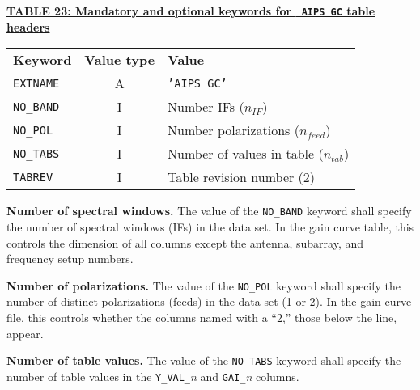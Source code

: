 \documentclass[twoside]{article}
\newcommand{\npol}{$n_{feed}$}
\newcommand{\nif}{$n_{IF}$}
\newcommand{\ntab}{$n_{tab}$}
\begin{document}
\begin{center}
\underline{\bf{TABLE 23: Mandatory and optional keywords for {\tt
   AIPS GC} table headers}}\\
\begin{tabular}{lcl}
\noalign{\vspace{2pt}} \label{ta:GCkeys}
\underline{{\bf Keyword}} & \underline{\bf{Value type}} &
    \underline{\bf{Value\vphantom{y}}} \\
\noalign{\vspace{2pt}}
{\tt EXTNAME}   & A & {\tt 'AIPS GC'}  \\
{\tt NO\_BAND}  & I & Number IFs (\nif) \\
{\tt NO\_POL}   & I & Number polarizations (\npol) \\
{\tt NO\_TABS}  & I & Number of values in table (\ntab) \\
{\tt TABREV}    & I & Table revision number (2)
\end{tabular}
\end{center}

{\bf Number of spectral windows.} The value of the {\tt NO\_BAND}
keyword shall specify the number of spectral windows (IFs) in the data
set.  In the gain curve table, this controls the dimension of all
columns except the antenna, subarray, and frequency setup numbers.

{\bf Number of polarizations.} The value of the {\tt NO\_POL}
keyword shall specify the number of distinct polarizations (feeds) in
the data set (1 or 2).  In the gain curve file, this controls whether
the columns named with a ``2,'' those below the line, appear.

{\bf Number of table values.} The value of the {\tt NO\_TABS} keyword
shall specify the number of table values in the {\tt Y\_VAL\_}{\it n}
and {\tt GAI\_}{\it n} columns.

\end{document}
